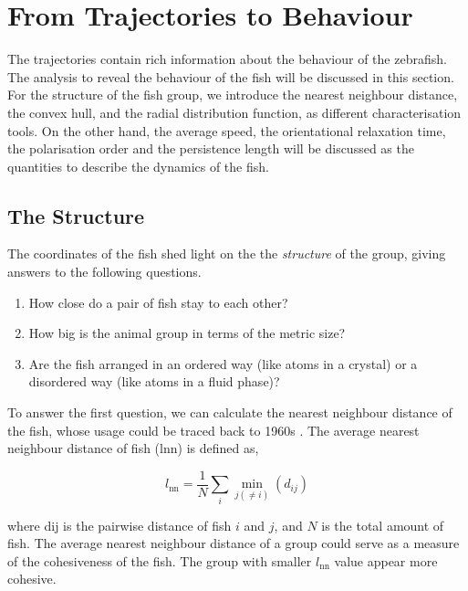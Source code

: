 \documentclass[11pt,twoside]{report}
\begin{document}
\section{From Trajectories to Behaviour}
\label{section:trajectory-analysis}

The trajectories contain rich information about the behaviour of the zebrafish.
The analysis to reveal the behaviour of the fish will be discussed in this section.
For the structure of the fish group, we introduce the nearest neighbour distance, the convex hull, and the radial distribution function, as different characterisation tools. On the other hand, the average speed, the orientational relaxation time, the polarisation order and the persistence length will be discussed as the quantities to describe the dynamics of the fish.


\subsection{The Structure}

The coordinates of the fish shed light on the the \emph{structure} of the group, giving answers to the following questions.

\begin{enumerate}
	\item How close do a pair of fish stay to each other?
	\item How big is the animal group in terms of the metric size?
	\item Are the fish arranged in an ordered way (like atoms in a crystal) or a disordered way (like atoms in a fluid phase)?
\end{enumerate}

To answer the first question, we can calculate the nearest neighbour distance of the fish, whose usage could be traced back to 1960s \cite{cullen1965}. The average nearest neighbour distance of fish (\gls{lnn}) is defined as,

\begin{equation}
	l_\textrm{nn} =\frac{1}{N}\sum_i\min_{j (\neq i)}(d_{ij})
\label{eq:nnd}
\end{equation}

\noindent where \gls{dij} is the pairwise distance of fish $i$ and $j$, and $N$ is the total amount of fish. The average nearest neighbour distance of a group could serve as a measure of the cohesiveness of the fish. The group with smaller $l_\textrm{nn}$ value appear more cohesive.
\end{document}
